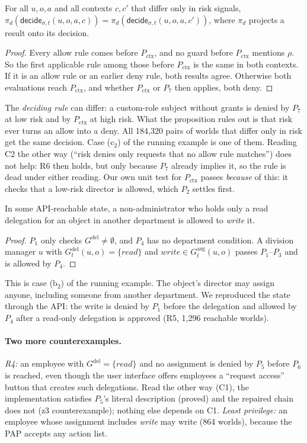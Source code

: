 \documentclass[sigconf,review,anonymous]{acmart}
\newcommand{\Px}{P_{\mathrm{ctx}}}
\newcommand{\Gasg}{G^{\mathrm{asg}}}
\newcommand{\Gdel}{G^{\mathrm{del}}}
\newcommand{\decide}{\mathsf{decide}}
\begin{document}
\begin{proposition}\label{prop:inert}
For all $u,o,a$ and all contexts $c,c'$ that differ only in risk signals,
$\pi_d(\decide_{\sigma,t}(u,o,a,c))=\pi_d(\decide_{\sigma,t}(u,o,a,c'))$, where $\pi_d$ projects a result onto
its decision.
\end{proposition}
\begin{proof}
Every allow rule comes before $\Px$, and no guard before $\Px$ mentions $\rho$. So the first applicable rule
among those before $\Px$ is the same in both contexts. If it is an allow rule or an earlier deny rule, both
results agree. Otherwise both evaluations reach $\Px$, and whether $\Px$ or $P_7$ then applies, both deny.
\end{proof}
The \emph{deciding rule} can differ: a custom-role subject without grants is denied by $P_7$ at low risk and by
$\Px$ at high risk. What the proposition rules out is that risk ever turns an allow into a deny.
All 184{,}320 pairs of worlds that differ only in risk get the same decision. Case (c$_2$) of the running
example is one of them. Reading C2 the other way (``risk denies only requests that no allow rule matches'')
does not help: R6 then holds, but only because $P_7$ already implies it, so the rule is dead under either
reading. Our own unit test for $\Px$ passes \emph{because} of this: it checks that a low-risk director is
allowed, which $P_2$ settles first.

\begin{proposition}\label{prop:unlock}
In some API-reachable state, a non-administrator who holds only a read delegation for an object in another
department is allowed to \emph{write} it.
\end{proposition}
\begin{proof}
$P_1$ only checks $\Gdel\neq\emptyset$, and $P_4$ has no department condition. A division manager $u$ with
$\Gdel_t(u,o)=\{\mathit{read}\}$ and $\mathit{write}\in\Gasg_t(u,o)$ passes $P_1$--$P_3$ and is allowed by $P_4$.
\end{proof}
This is case (b$_2$) of the running example. The object's director may assign anyone, including someone from
another department. We reproduced the state through the API: the write is denied by $P_1$ before the
delegation and allowed by $P_4$ after a read-only delegation is approved (R5, 1{,}296 reachable worlds).

\paragraph{Two more counterexamples.} \emph{R4:} an employee with $\Gdel=\{\mathit{read}\}$ and no assignment is
denied by $P_5$ before $P_6$ is reached, even though the user interface offers employees a ``request access''
button that creates such delegations. Read the other way (C1), the implementation satisfies $P_5$'s
literal description (proved) and the repaired chain does not (z3 counterexample); nothing else depends on C1.
\emph{Least privilege:} an employee whose assignment includes \emph{write} may write (864 worlds), because the PAP
accepts any action list.
\end{document}
